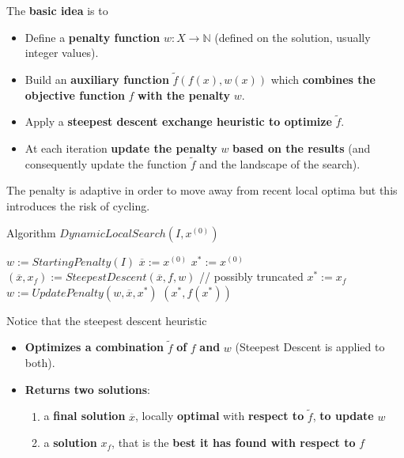 The \textbf{basic idea} is to
\begin{itemize}
	\item Define a \textbf{penalty function} $w : X \rightarrow \mathbb{N}$ (defined on the solution, usually integer values).\\
	
	\item Build an \textbf{auxiliary function} $\tilde{f} (f (x) , w (x))$ which \textbf{combines the objective function} $f$ \textbf{with the penalty} $w$.\\
	
	\item Apply a \textbf{steepest descent exchange heuristic to optimize} $\tilde{f}$.\\
	
	\item At each iteration \textbf{update the penalty} $w$ \textbf{based on the results} (and consequently update the function $\tilde{f}$ and the landscape of the search).\\
\end{itemize}

The penalty is adaptive in order to move away from recent local optima but this introduces the risk of cycling.\\

\newpage

\begin{algorithm}
	\caption{Algorithm $DynamicLocalSearch(I , x^{(0)})$}
	\begin{algorithmic}
		\STATE $w := StartingPenalty(I )$
		\STATE $\overline{x} := x^{(0)}$
		\STATE $x^\ast := x^{(0)}$
		\STATE $(\overline{x}, x_f) := SteepestDescent(\overline{x}, f , w )$ // possibly truncated
		\STATE $x^\ast := x_f$
		\ENDIF
		\STATE $w := UpdatePenalty(w, \overline{x}, x^\ast)$
		\ENDWHILE
		\RETURN $(x^\ast, f (x^\ast))$
	\end{algorithmic}
\end{algorithm}
Notice that the steepest descent heuristic
\begin{itemize}
	\item \textbf{Optimizes a combination} $\tilde{f}$ \textbf{of} $f$ \textbf{and} $w$ (Steepest Descent is applied to both).\\
	
	\item \textbf{Returns two solutions}:
	\begin{enumerate}
		\item a \textbf{final solution} $\overline{x}$, locally \textbf{optimal} with \textbf{respect to} $\tilde{f}$, \textbf{to update} $w$
		\item a \textbf{solution} $x_f$, that is the \textbf{best it has found with respect to} $f$
	\end{enumerate}
\end{itemize}

